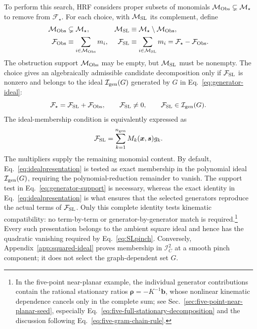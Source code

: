 \documentclass[a4paper,11pt]{article}
\newcommand{\x}{\boldsymbol{x}}
\newcommand{\s}{\boldsymbol{s}}
\newcommand{\FSL}{\mathcal F_{\rm SL}}
\newcommand{\MSL}{\mathcal M_{\rm SL}}
\newcommand{\MObs}{\mathcal M_{\rm Obs}}
\newcommand{\FObs}{\mathcal F_{\rm Obs}}
\newcommand{\ideal}{\mathcal I}
\begin{document}
To perform this search, HRF considers proper subsets of monomials
\(\MObs\subsetneq\mathcal M_\star\) to remove from \(\mathcal F_\star\).  For
each choice, with \(\MSL\) its complement, define
\begin{align}
 \MObs&\subsetneq\mathcal M_\star,
 &\MSL&\equiv\mathcal M_\star\setminus\MObs,
 \nonumber\\
 \FObs&\equiv\sum_{i\in\MObs}m_i,
 &\FSL&\equiv\sum_{i\in\MSL}m_i
       =\mathcal F_\star-\FObs.
 \label{eq:candidate-obstruction}
\end{align}
The obstruction support \(\MObs\) may be empty, but \(\MSL\) must be
nonempty.  The choice gives an algebraically admissible candidate
decomposition only if \(\FSL\) is nonzero and belongs to the ideal
\(\mathcal I_{\rm gen}(G)\) generated by \(G\) in Eq.~\eqref{eq:generator-ideal}:
\begin{equation}
 \mathcal F_\star=\FSL+\FObs,
 \qquad
 \FSL\neq0,
 \qquad
 \FSL\in\mathcal I_{\rm gen}(G).
\label{eq:obstruction}
\end{equation}
The ideal-membership condition is equivalently expressed as
\begin{equation}
 \FSL=\sum_{k=1}^{n_{\rm gen}}M_k(\x,\s)g_k.
\label{eq:idealpresentation}
\end{equation}
The multipliers supply the remaining monomial content.  By default,
Eq.~\eqref{eq:idealpresentation} is tested as exact membership in the
polynomial ideal \(\mathcal I_{\rm gen}(G)\), requiring the
polynomial-reduction remainder to vanish.  The support test in
Eq.~\eqref{eq:generator-support} is necessary,
whereas the exact identity in Eq.~\eqref{eq:idealpresentation} is what ensures
that the selected generators reproduce the actual terms of \(\FSL\).
Only this complete identity tests kinematic compatibility: no term-by-term or
generator-by-generator match is required.\footnote{In the five-point
near-planar example, the individual generator contributions contain the
rational stationary ratios \(\boldsymbol\rho=-K^{-1}\boldsymbol b\), whose
nonlinear kinematic dependence cancels only in the complete sum; see
Sec.~\ref{sec:five-point-near-planar-seed}, especially
Eq.~\eqref{eq:five-full-stationary-decomposition} and the discussion following
Eq.~\eqref{eq:five-gram-chain-rule}.}
Every such presentation belongs to the ambient square ideal and hence has the
quadratic vanishing required by Eq.~\eqref{eq:SLpinch}.  Conversely,
Appendix~\ref{app:squared-ideal} proves membership in \(\ideal_C^2\) at a
smooth pinch component; it does not select the graph-dependent set \(G\).
\end{document}
